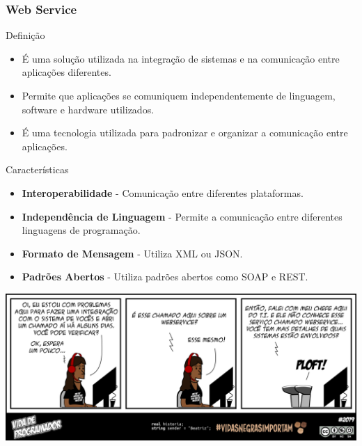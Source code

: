 \documentclass[
	9pt, %
	t, %
]{beamer}
\begin{document}
\begin{frame}
	\frametitle{Web Service}

	\begin{block}{Definição}
		\begin{itemize}
			\item É uma solução utilizada na integração de sistemas e na comunicação entre aplicações diferentes.
			\item Permite que aplicações se comuniquem independentemente de linguagem, software e
			      hardware utilizados.
			\item É uma tecnologia utilizada para \alert{padronizar} e \alert{organizar} a comunicação entre aplicações.
		\end{itemize}
	\end{block}

	\begin{block}{Características}
		\begin{itemize}
			\item \textbf{Interoperabilidade} - Comunicação entre diferentes plataformas.
			\item \textbf{Independência de Linguagem} - Permite a comunicação entre diferentes linguagens de programação.
			\item \textbf{Formato de Mensagem} - Utiliza XML ou JSON.
			\item \textbf{Padrões Abertos} - Utiliza padrões abertos como SOAP e REST.
		\end{itemize}
	\end{block}

\end{frame}

\begin{frame}[plain, c]
	\centering
	\includegraphics[width=0.9\linewidth]{vdp_ws.png}
\end{frame}
\end{document}
